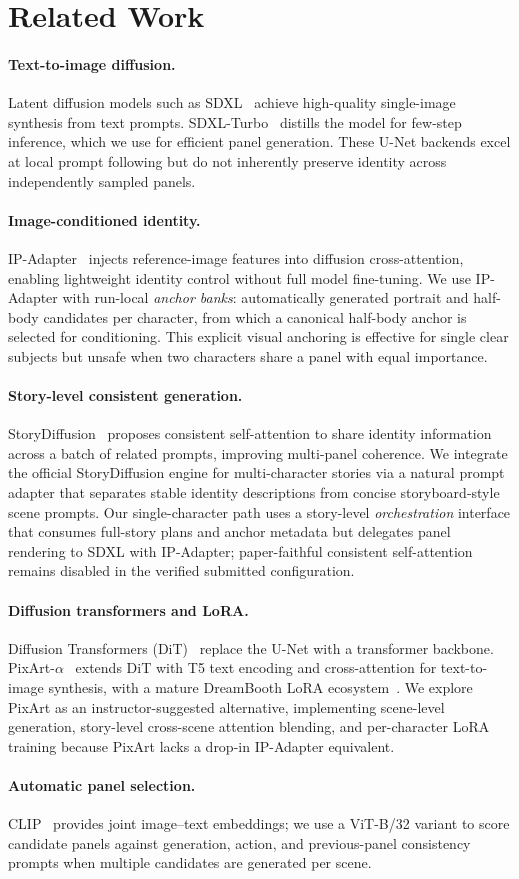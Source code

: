 \section{Related Work}
\label{sec:related}

\paragraph{Text-to-image diffusion.}
Latent diffusion models such as SDXL~\cite{podell2023sdxl} achieve high-quality single-image synthesis from text prompts.
SDXL-Turbo~\cite{sauer2023turbo} distills the model for few-step inference, which we use for efficient panel generation.
These U-Net backends excel at local prompt following but do not inherently preserve identity across independently sampled panels.

\paragraph{Image-conditioned identity.}
IP-Adapter~\cite{ipadapter2023} injects reference-image features into diffusion cross-attention, enabling lightweight identity control without full model fine-tuning.
We use IP-Adapter with run-local \emph{anchor banks}: automatically generated portrait and half-body candidates per character, from which a canonical half-body anchor is selected for conditioning.
This explicit visual anchoring is effective for single clear subjects but unsafe when two characters share a panel with equal importance.

\paragraph{Story-level consistent generation.}
StoryDiffusion~\cite{storydiffusion2024} proposes consistent self-attention to share identity information across a batch of related prompts, improving multi-panel coherence.
We integrate the official StoryDiffusion engine for multi-character stories via a natural prompt adapter that separates stable identity descriptions from concise storyboard-style scene prompts.
Our single-character path uses a story-level \emph{orchestration} interface that consumes full-story plans and anchor metadata but delegates panel rendering to SDXL with IP-Adapter; paper-faithful consistent self-attention remains disabled in the verified submitted configuration.

\paragraph{Diffusion transformers and LoRA.}
Diffusion Transformers (DiT)~\cite{peebles2023dit} replace the U-Net with a transformer backbone.
PixArt-$\alpha$~\cite{chen2023pixart} extends DiT with T5 text encoding and cross-attention for text-to-image synthesis, with a mature DreamBooth LoRA ecosystem~\cite{ruiz2023dreambooth}.
We explore PixArt as an instructor-suggested alternative, implementing scene-level generation, story-level cross-scene attention blending, and per-character LoRA training because PixArt lacks a drop-in IP-Adapter equivalent.

\paragraph{Automatic panel selection.}
CLIP~\cite{radford2021clip} provides joint image--text embeddings; we use a ViT-B/32 variant to score candidate panels against generation, action, and previous-panel consistency prompts when multiple candidates are generated per scene.
